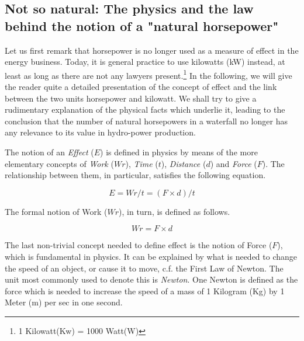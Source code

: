 \subsection{Not so natural: The physics and the law behind the notion of a "natural horsepower"}\label{subsec:notnat}

Let us first remark that horsepower is no longer used as a measure of effect in the energy business. Today, it is general practice to use kilowatts (kW) instead, at least as long as there are not any lawyers present.\footnote{1 Kilowatt(Kw) = 1000 Watt(W)} In the following, we will give the reader quite a detailed presentation of the concept of effect and the link between the two units horsepower and kilowatt. We shall try to give a rudimentary explanation of the physical facts which underlie it, leading to the conclusion that the number of natural horsepowers in a waterfall no longer has any relevance to its value in hydro-power production.


The notion of an \emph{Effect} ($E$) is defined in physics by means of the more elementary concepts of \emph{Work} ($Wr$), \emph{Time} ($t$), \emph{Distance} ($d$) and \emph{Force} ($F$). The relationship between them, in particular, satisfies the following equation.

\begin{equation}\label{eq:effect}
E = Wr/t = (F \times d)/t
\end{equation}

The formal notion of Work ($Wr$), in turn, is defined as follows.

\begin{equation}\label{eq:work}
Wr = F \times d
\end{equation}

The last non-trivial concept needed to define effect is the notion of Force ($F$), which is fundamental in physics. It can be explained by what is needed to change the speed of an object, or cause it to move, c.f. the First Law of Newton. The unit most commonly used to denote this is \emph{Newton}. One Newton is defined as the force which is needed to increase the speed of a mass of 1 Kilogram (Kg) by 1 Meter (m) per sec in one second. 

